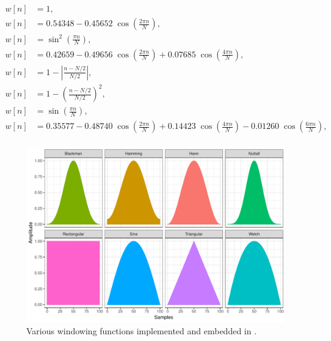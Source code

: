 \documentclass[a4paper,9pt]{extarticle}
\begin{document}
\begin{align}
  w[n] & = 1,
  \tag*{\small(rectangular)} \\
  w[n] & = 0.54348-0.45652\;\cos \left(\tfrac {2\pi n}{N}\right),
  \tag*{\small(Hamming)} \\
  w[n] & = \sin^2 \left(\tfrac {\pi n}{N}\right),
  \tag*{\small(Hann)} \\
  w[n] & = 0.42659-0.49656\;\cos \left(\tfrac {2\pi n}{N}\right)+0.07685\;\cos \left(\tfrac {4\pi n}{N}\right),
  \tag*{\small(Blackman)} \\
  w[n] & = 1-\left|\tfrac {n-N/2}{N/2}\right|,
  \tag*{\small(triangular/Bartlett)} \\
  w[n] & = 1-\left(\tfrac {n-N/2}{N/2}\right)^{2},
  \tag*{\small(Welch)} \\
  w[n] & = \sin \left(\tfrac {\pi n}{N}\right),
  \tag*{\small(sine)} \\
  w[n] & = 0.35577-0.48740\;\cos \left(\tfrac {2\pi n}{N}\right)+0.14423\;\cos \left(\tfrac {4\pi n}{N}\right)-0.01260\;\cos \left(\tfrac {6\pi n}{N}\right),
  \tag*{\small(Nuttall)} \\
  \label{eq.filter}
\end{align}
\begin{figure}[!h]
  \centering
  \includegraphics[width=\linewidth]{fig/filters.pdf}
  \caption{Various windowing functions implemented and embedded in \smashpp.}
  \label{fig.filters}
\end{figure}
\end{document}
